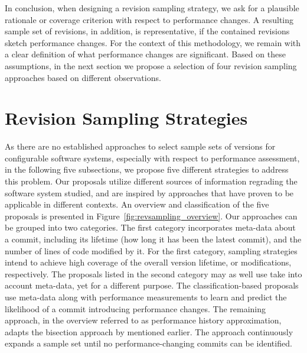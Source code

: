 In conclusion, when designing a revision sampling strategy, we ask for a
plausible rationale or coverage criterion with respect to performance changes.
A resulting sample set of revisions, in addition, is representative, if the
contained revisions sketch performance changes. For the context of this
methodology, we remain with a clear definition of what performance
changes are significant. Based on these assumptions, in the next section we
propose a selection of four revision sampling approaches based on different
observations.
 
\section{Revision Sampling Strategies}\label{sec:revsampling_strat}
As there are no established approaches to select sample sets of versions for
configurable software systems, especially with respect to performance
assessment, in the following five subsections, we propose five different
strategies to address this problem. Our proposals utilize different sources of
information regrading the software system studied, and are inspired by
approaches that have proven to be applicable in different contexts. An overview
and classification of the five proposals is presented in
Figure~\ref{fig:revsampling_overview}. 
Our approaches can be grouped into two categories. The first category incorporates
meta-data about a commit, including its lifetime (how long it has been the
latest commit), and the number of lines of code modified by it. For the first
category, sampling strategies intend to achieve high coverage of the overall
version lifetime, or modifications, respectively. The proposals listed in the
second category may as well use take into account meta-data, yet for a
different purpose. The classification-based proposals use meta-data along with
performance measurements to learn and predict the likelihood of a commit
introducing performance changes. The remaining approach, in the overview
referred to as performance history approximation, adapts the bisection approach
by \cite{heger_automated_2013} mentioned earlier. The approach continuously expands a sample
set until no performance-changing commits can be identified.

